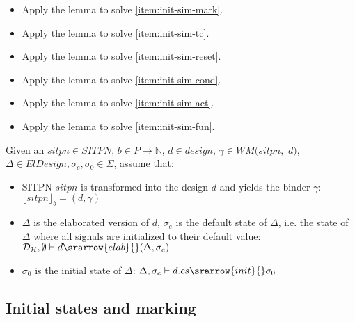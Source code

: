 \documentclass[dvipsnames,12pt]{article}
\begin{document}
\begin{niproof}
  \begin{itemize}
  \item Apply the  lemma to solve \ref{item:init-sim-mark}.
  \item Apply the  lemma to solve \ref{item:init-sim-tc}.
  \item Apply the  lemma to solve \ref{item:init-sim-reset}.
  \item Apply the  lemma to solve \ref{item:init-sim-cond}.
  \item Apply the  lemma to solve \ref{item:init-sim-act}.
  \item Apply the  lemma to solve \ref{item:init-sim-fun}.
  \end{itemize}
\end{niproof}

\begin{definition}
  \label{def:init-states-hyps}
  Given an $sitpn\in{}SITPN$, $b\in{}P\rightarrow\mathbb{N}$,
  $d\in{}design$, $\gamma\in{}WM(sitpn,$ $d)$,
  $\Delta\in{}ElDesign,\sigma_{e},\sigma_0\in{}\Sigma$, assume that:
  \begin{itemize}
  \item SITPN $sitpn$ is transformed into the design $d$ and yields
    the binder $\gamma$: $\lfloor{}sitpn\rfloor_b=(d,\gamma)$
  \item $\Delta$ is the elaborated version of $d$, $\sigma_e$ is the
    default state of $\Delta$, i.e. the state of $\Delta$ where all signals are initialized to their default value:\\
    $\mathcal{D}_\mathcal{H},\emptyset\vdash{}d\srarrow{elab}{\fontsize{6}{8}\selectfont}(\Delta,\sigma_{e})$
    
  \item $\sigma_0$ is the initial state of $\Delta$: 
    $\Delta,\sigma_{e}\vdash{}d.cs\srarrow{init}{\fontsize{6}{8}\selectfont}\sigma_0$
  \end{itemize}
\end{definition}

\def\inithyps{For all $sitpn\in{}SITPN$,
  $b\in{}P\rightarrow\mathbb{N}$, $d\in{}design$,
  $\gamma\in{}WM(sitpn,d)$,
  $\Delta\in{}ElDesign,\sigma_{e},\sigma_0\in{}\Sigma$ that verify the
  hypotheses of Definition~\ref{def:init-states-hyps},}

\subsection{Initial states and marking}
\label{sec:init-states-marking}
\end{document}
